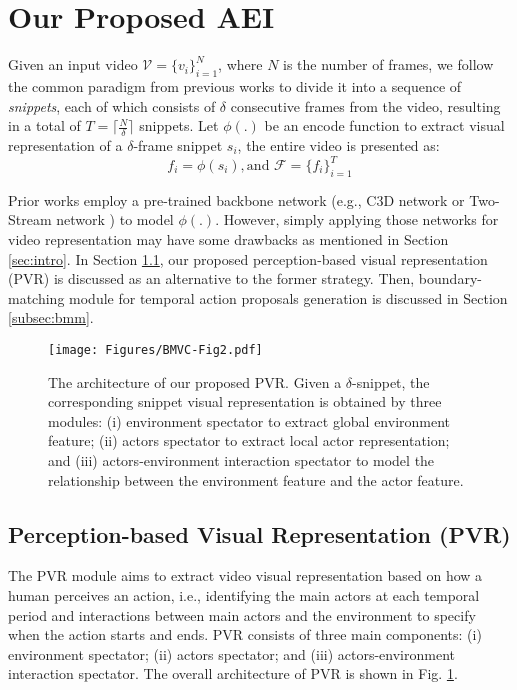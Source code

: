 \documentclass{bmvc2k}
\begin{document}
\section{Our Proposed AEI}


Given an input video $\mathcal{V}=\{v_i\}_{i=1}^{N}$, where $N$ is the number of frames, we follow the common paradigm from previous works to divide it into a sequence of \textit{snippets}, each of which consists of $\delta$ consecutive frames from the video, resulting in a total of $T=\bigr\lceil \frac{N}{\delta} \bigr\rceil$ snippets. Let $\phi(.)$ be an encode function to extract visual representation of a $\delta$-frame snippet $s_i$, the entire video is presented as:
\begin{equation}
        f_i  =\phi(s_i), \text{and } \mathcal{F} =\{f_i\}_{i=1}^{T}
\end{equation}



Prior works \cite{bmn, lin2018bsn, xu2020gtad} employ a pre-trained backbone network (e.g., C3D network \cite{C3D} or Two-Stream network \cite{2_stream_1}) to model $\phi(.)$.
However, simply applying those networks for video representation may have some drawbacks as mentioned in Section \ref{sec:intro}. In Section \ref{subsec:pvr}, our proposed perception-based visual representation (PVR) is discussed as an alternative to the former strategy. Then, boundary-matching module for temporal action proposals generation is discussed in Section \ref{subsec:bmm}. 







\begin{figure}[t]
\centering
  \texttt{[image: Figures/BMVC-Fig2.pdf]}
  \vspace*{0.2cm}
  \caption{The architecture of our proposed PVR. Given a $\delta$-snippet, the corresponding snippet visual representation is obtained by three modules: (i) environment spectator to extract global environment feature; (ii) actors spectator to extract local actor representation; and (iii) actors-environment interaction spectator to model the relationship between the environment feature and the actor feature.}
  \vspace*{-0.4cm}
  \label{video_representation}
\end{figure}

\subsection{Perception-based Visual Representation (PVR)}
\label{subsec:pvr}
The PVR module aims to extract video visual representation based on how a human perceives an action, i.e., identifying the main actors at each temporal period and interactions between main actors and the environment to specify when the action starts and ends. PVR consists of three main components: (i) environment spectator; (ii) actors spectator; and (iii) actors-environment interaction spectator. The overall architecture of PVR is shown in Fig. \ref{video_representation}.
\end{document}
